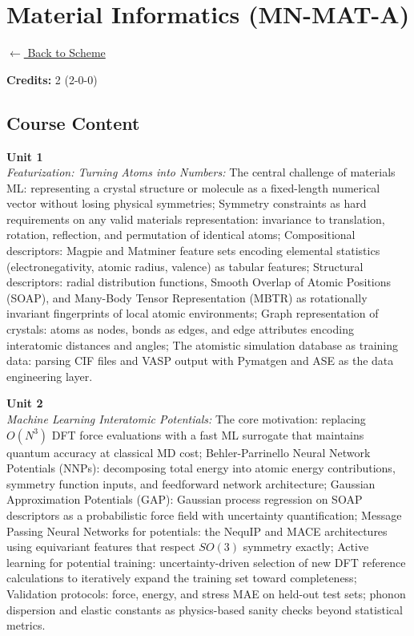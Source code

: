 \section*{Material Informatics (MN-MAT-A)}
\label{minor:MAT_L2}

\noindent \small{\hyperref[main:scheme]{$\leftarrow$ Back to Scheme}} \vspace{0.5cm}

\noindent \textbf{Credits:} 2 (2-0-0)

\subsection*{Course Content}
\noindent\textbf{Unit 1} \\
\textit{Featurization: Turning Atoms into Numbers:} The central challenge of materials ML: representing a crystal structure or molecule as a fixed-length numerical vector without losing physical symmetries; Symmetry constraints as hard requirements on any valid materials representation: invariance to translation, rotation, reflection, and permutation of identical atoms; Compositional descriptors: Magpie and Matminer feature sets encoding elemental statistics (electronegativity, atomic radius, valence) as tabular features; Structural descriptors: radial distribution functions, Smooth Overlap of Atomic Positions (SOAP), and Many-Body Tensor Representation (MBTR) as rotationally invariant fingerprints of local atomic environments; Graph representation of crystals: atoms as nodes, bonds as edges, and edge attributes encoding interatomic distances and angles; The atomistic simulation database as training data: parsing CIF files and VASP output with Pymatgen and ASE as the data engineering layer.

\vspace{0.3cm}

\noindent\textbf{Unit 2} \\
\textit{Machine Learning Interatomic Potentials:} The core motivation: replacing $O(N^3)$ DFT force evaluations with a fast ML surrogate that maintains quantum accuracy at classical MD cost; Behler-Parrinello Neural Network Potentials (NNPs): decomposing total energy into atomic energy contributions, symmetry function inputs, and feedforward network architecture; Gaussian Approximation Potentials (GAP): Gaussian process regression on SOAP descriptors as a probabilistic force field with uncertainty quantification; Message Passing Neural Networks for potentials: the NequIP and MACE architectures using equivariant features that respect $SO(3)$ symmetry exactly; Active learning for potential training: uncertainty-driven selection of new DFT reference calculations to iteratively expand the training set toward completeness; Validation protocols: force, energy, and stress MAE on held-out test sets; phonon dispersion and elastic constants as physics-based sanity checks beyond statistical metrics.

